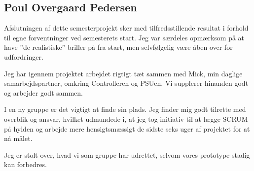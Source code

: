 \subsection*{Poul Overgaard Pedersen}

Afslutningen af dette semesterprojekt sker med tilfredsstillende resultat i forhold til egne forventninger ved semesterets start. Jeg var særdeles opmærksom på at have ''de realistiske'' briller på fra start, men selvfølgelig være åben over for udfordringer. 

Jeg har igennem projektet arbejdet rigtigt tæt sammen med Mick, min daglige samarbejdspartner, omkring Controlleren og PSUen. Vi supplerer hinanden godt og arbejder godt sammen. 

I en ny gruppe er det vigtigt at finde sin plads. Jeg finder mig godt tilrette med overblik og ansvar, hvilket udmundede i, at jeg tog initiativ til at lægge SCRUM på hylden og arbejde mere hensigtsmæssigt de sidste seks uger af projektet for at nå målet. 

Jeg er stolt over, hvad vi som gruppe har udrettet, selvom vores prototype stadig kan forbedres. 